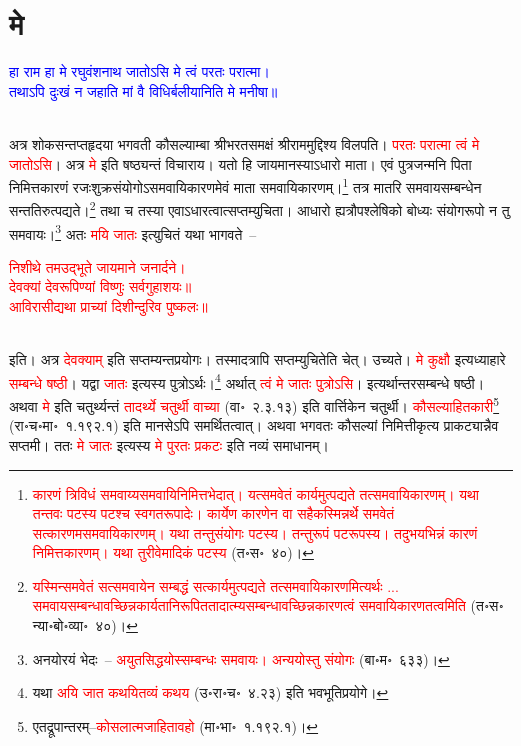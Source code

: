 \section[मे]{मे}
\centering\textcolor{blue}{हा राम हा मे रघुवंशनाथ जातोऽसि मे त्वं परतः परात्मा।\nopagebreak\\
तथाऽपि दुःखं न जहाति मां वै विधिर्बलीयानिति मे मनीषा॥}\nopagebreak\\
\\
\begin{sloppypar}\justifying\noindent\hspace{10mm} अत्र शोक\-सन्तप्त\-हृदया भगवती कौसल्याम्बा श्रीभरत\-समक्षं श्रीराममुद्दिश्य विलपति। \textcolor{red}{परतः परात्मा त्वं मे जातोऽसि}। अत्र \textcolor{red}{मे} इति षष्ठ्यन्तं विचाराय। यतो हि जायमानस्याऽधारो माता। एवं पुत्र\-जन्मनि पिता निमित्त\-कारणं रजः\-शुक्र\-संयोगोऽसमवायि\-कारणमेवं माता समवायि\-कारणम्।\footnote{\textcolor{red}{कारणं त्रिविधं समवाय्यसमवायि\-निमित्त\-भेदात्। यत्समवेतं कार्यमुत्पद्यते तत्समवायि\-कारणम्। यथा तन्तवः पटस्य पटश्च स्वगतरूपादेः। कार्येण कारणेन वा सहैकस्मिन्नर्थे समवेतं सत्कारणमसमवायिकारणम्। यथा तन्तुसंयोगः पटस्य। तन्तुरूपं पटरूपस्य। तदुभयभिन्नं कारणं निमित्तकारणम्। यथा तुरीवेमादिकं पटस्य} (त॰स॰~४०)।} तत्र मातरि समवाय\-सम्बन्धेन सन्ततिरुत्पद्यते।\footnote{\textcolor{red}{यस्मिन्समवेतं सत्समवायेन सम्बद्धं सत्कार्यमुत्पद्यते तत्समवायि\-कारणमित्यर्थः ... समवाय\-सम्बन्धावच्छिन्न\-कार्यता\-निरूपित\-तादात्म्य\-सम्बन्धावच्छिन्न\-कारणत्वं समवायि\-कारणतत्वमिति} (त॰स॰ न्या॰बो॰व्या॰~४०)।} तथा च तस्या एवाऽधारत्वात्सप्तम्युचिता। आधारो ह्यत्रौपश्लेषिको बोध्यः संयोग\-रूपो न तु समवायः।\footnote{अनयोरयं भेदः~– \textcolor{red}{अयुत\-सिद्धयोस्सम्बन्धः समवायः। अन्ययोस्तु संयोगः} (बा॰म॰~६३३)।} अतः \textcolor{red}{मयि जातः} इत्युचितं यथा भागवते~–\end{sloppypar}
\centering\textcolor{red}{निशीथे तमउद्भूते जायमाने जनार्दने।\nopagebreak\\
देवक्यां देवरूपिण्यां विष्णुः सर्वगुहाशयः॥\nopagebreak\\
आविरासीद्यथा प्राच्यां दिशीन्दुरिव पुष्कलः॥}\nopagebreak\\
\\
\begin{sloppypar}\justifying\noindent इति। अत्र \textcolor{red}{देवक्याम्‌} इति सप्तम्यन्त\-प्रयोगः। तस्मादत्रापि सप्तम्युचितेति चेत्। उच्यते। \textcolor{red}{मे कुक्षौ} इत्यध्याहारे \textcolor{red}{सम्बन्धे षष्ठी}। यद्वा \textcolor{red}{जातः} इत्यस्य पुत्रोऽर्थः।\footnote{यथा \textcolor{red}{अयि जात कथयितव्यं कथय} (उ॰रा॰च॰~४.२३) इति भवभूति\-प्रयोगे।} अर्थात् \textcolor{red}{त्वं मे जातः पुत्रोऽसि}। इत्यर्थान्तर\-सम्बन्धे षष्ठी। अथवा \textcolor{red}{मे} इति चतुर्थ्यन्तं \textcolor{red}{तादर्थ्ये चतुर्थी वाच्या} (वा॰~२.३.१३) इति वार्त्तिकेन चतुर्थी। \textcolor{red}{कौसल्या\-हित\-कारी}\footnote{एतद्रूपान्तरम्–\textcolor{red}{कोसलात्मजाहितावहो} (मा॰भा॰~१.१९२.१)।} (रा॰च॰मा॰~१.१९२.१) इति मानसेऽपि समर्थितत्वात्। अथवा भगवतः कौसल्यां निमित्ती\-कृत्य प्राकट्यान्नैव सप्तमी। ततः \textcolor{red}{मे जातः} इत्यस्य \textcolor{red}{मे पुरतः प्रकटः} इति नव्यं समाधानम्।\end{sloppypar}
